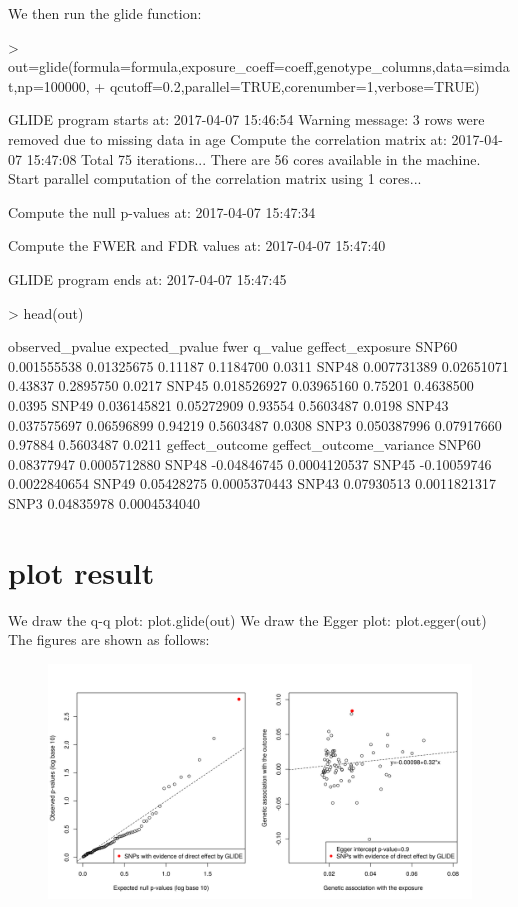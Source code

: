 \documentclass[12pt]{article}
\begin{document}
We then run the glide function:
\begin{Schunk}
\begin{Sinput}
> out=glide(formula=formula,exposure_coeff=coeff,genotype_columns,data=simdat,np=100000,
+ qcutoff=0.2,parallel=TRUE,corenumber=1,verbose=TRUE)
\end{Sinput}
\begin{Soutput}
GLIDE program starts at: 2017-04-07 15:46:54
Warning message: 3 rows were removed due to missing data in age
Compute the correlation matrix at: 2017-04-07 15:47:08
Total 75 iterations... 
There are 56 cores available in the machine.
Start parallel computation of the correlation matrix using 1 cores...


Compute the null p-values at: 2017-04-07 15:47:34

Compute the FWER and FDR values at: 2017-04-07 15:47:40

GLIDE program ends at: 2017-04-07 15:47:45
\end{Soutput}
\begin{Sinput}
> head(out)
\end{Sinput}
\begin{Soutput}
      observed_pvalue expected_pvalue    fwer   q_value geffect_exposure
SNP60     0.001555538      0.01325675 0.11187 0.1184700           0.0311
SNP48     0.007731389      0.02651071 0.43837 0.2895750           0.0217
SNP45     0.018526927      0.03965160 0.75201 0.4638500           0.0395
SNP49     0.036145821      0.05272909 0.93554 0.5603487           0.0198
SNP43     0.037575697      0.06596899 0.94219 0.5603487           0.0308
SNP3      0.050387996      0.07917660 0.97884 0.5603487           0.0211
      geffect_outcome geffect_outcome_variance
SNP60      0.08377947             0.0005712880
SNP48     -0.04846745             0.0004120537
SNP45     -0.10059746             0.0022840654
SNP49      0.05428275             0.0005370443
SNP43      0.07930513             0.0011821317
SNP3       0.04835978             0.0004534040
\end{Soutput}
\end{Schunk}

\section{plot result}
We draw the q-q plot: plot.glide(out)
We draw the Egger plot: plot.egger(out)
The figures are shown as follows:
\begin{figure}[h]\includegraphics{./plot.png}\end{figure}
\end{document}
